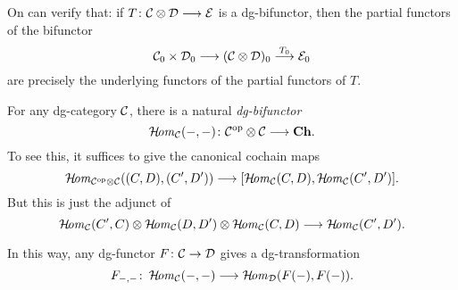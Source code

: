 \begin{Rem}
On can verify that: 
if $T\colon\Cc\otimes\Dd\To\Ee$ is a dg-bifunctor, 
then the partial functors of the bifunctor
\[
\Cc_0\times\Dd_0\To(\Cc\otimes\Dd)_0\markar{T_0}\Ee_0
\]
are precisely the underlying functors of 
the partial functors of $T$.
\end{Rem}

\begin{example}
For any dg-category $\Cc$, 
there is a natural \emph{dg-bifunctor} 
\[
\HHom_{\Cc}(-,-)\colon\Cc^{\opp}\otimes\Cc\To\Ch.
\]
To see this, it suffices to give the canonical cochain maps
\[
\HHom_{\Cc^{\opp}\otimes\Cc}((C,D),(C',D'))
\To
[\HHom_{\Cc}(C,D),\HHom_{\Cc}(C',D')].
\]
But this is just the adjunct of 
\[
\HHom_{\Cc}(C',C)\otimes\HHom_{\Cc}(D,D')\otimes\HHom_{\Cc}(C,D)
\To
\HHom_{\Cc}(C',D').
\]

In this way, any dg-functor $F\colon\Cc\to\Dd$ gives 
a dg-transformation 
\[
F_{-,-}\colon\HHom_{\Cc}(-,-)\To\HHom_{\Dd}(F(-),F(-)).
\]
\end{example}

